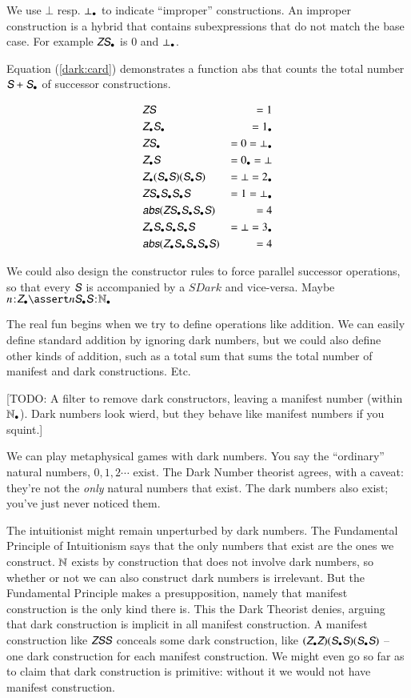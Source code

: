 \documentclass{article}
\begin{document}
We use \(\bot\) resp. \(\bot_{\bullet}\) to indicate ``improper''
constructions. An improper construction is a hybrid that contains
subexpressions that do not match the base case. For example
\(\ZNat\SDark\) is \(0\) and \(\bot_{\bullet}\).

Equation (\ref{dark:card}) demonstrates a function \textsf{abs} that
counts the total number \(\SNat + \SDark\) of successor constructions.

\begin{align}
  & \ZS & = 1 \\
  & \ZDark\SDark & = \dark{1}\\
  & \ZNat\SDark & = 0 = \dark{\bot}\\
  & \ZDark\SNat & = \dark{0} = \bot \\
  & \ZDark(\SDark\SNat)(\SDark\SNat) & = \bot = \dark{2} \\
  & \ZNat\SDark\SDark\SDark\SNat & = 1 = \dark{\bot} \label{dark:hybrid} \\
  & \textsf{\slshape abs}(\ZNat\SDark\SDark\SDark\SNat) & = 4 \label{dark:card} \\
  & \ZDark\SDark\SDark\SDark\SNat & = \bot = \dark{3} \\
  & \textsf{\slshape abs}(\ZDark\SDark\SDark\SDark\SNat) & = 4
\end{align}

We could also design the constructor rules to force parallel successor
operations, so that every \(\SNat\) is accompanied by a \(SDark\) and
vice-versa.  Maybe \(\tj{n}{\ZDark} \linfer \tj{n\SDark\SNat}{\NDark}\)


The real fun begins when we try to define operations like addition. We
can easily define standard addition by ignoring dark numbers, but we
could also define other kinds of addition, such as a total sum that
sums the total number of manifest and dark constructions. Etc.

[TODO:  A
  filter to remove dark constructors, leaving a manifest number
  (within \(\mathbb{N}_{\bullet}\)). Dark numbers look wierd, but they behave like
  manifest numbers if you squint.]


We can play metaphysical games with dark numbers. You say the
``ordinary'' natural numbers, \(0,1,2\cdots\) exist. The Dark Number
theorist agrees, with a caveat: they're not the \textit{only} natural
numbers that exist. The dark numbers also exist; you've just never
noticed them.

The intuitionist might remain unperturbed by dark numbers. The
Fundamental Principle of Intuitionism says that the only numbers that
exist are the ones we construct. \(\mathbb{N}\) exists by construction that
does not involve dark numbers, so whether or not we can also construct
dark numbers is irrelevant. But the Fundamental Principle makes a
presupposition, namely that manifest construction is the only kind
there is. This the Dark Theorist denies, arguing that dark
construction is implicit in all manifest construction. A manifest
construction like \(\ZSS\) conceals some dark construction, like
\((\ZDark\ZNat)(\SDark\SNat)(\SDark\SNat)\) -- one dark construction
for each manifest construction. We might even go so far as to claim
that dark construction is primitive: without it we would not have
manifest construction.
\end{document}
